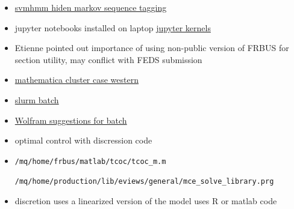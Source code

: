 \documentclass[hyperref]{labbook}
\begin{document}


\begin{itemize}
\item \href{https://www.cs.cornell.edu/People/tj/svm_light/svm_hmm.html}{svmhmm hiden markov sequence tagging}
\end{itemize}


\begin{itemize}
\item jupyter notebooks installed on laptop 
\href{https://github.com/jupyter/jupyter/wiki/Jupyter-kernels}{jupyter kernels}
\end{itemize}


\begin{itemize}
\item Etienne pointed out importance of using non-public version of FRBUS for section utility,  may conflict with FEDS submission
\end{itemize}


  \begin{itemize}
  \item \href{https://sites.google.com/a/case.edu/hpc-upgraded-cluster/home/Software-Guide/mathematica}{mathematica cluster case western}
  \item \href{https://rcc.uchicago.edu/docs/software/environments/mathematica/index.html}{slurm batch}
  \item \href{}{Wolfram suggestions for batch}
  \end{itemize}


\begin{itemize}
\item optimal control with discression code 
\item \verb!/mq/home/frbus/matlab/tcoc/tcoc_m.m!

\verb!/mq/home/production/lib/eviews/general/mce_solve_library.prg!
\item discretion uses a linearized version of the model  uses R or matlab code
\end{itemize}

\end{document}
